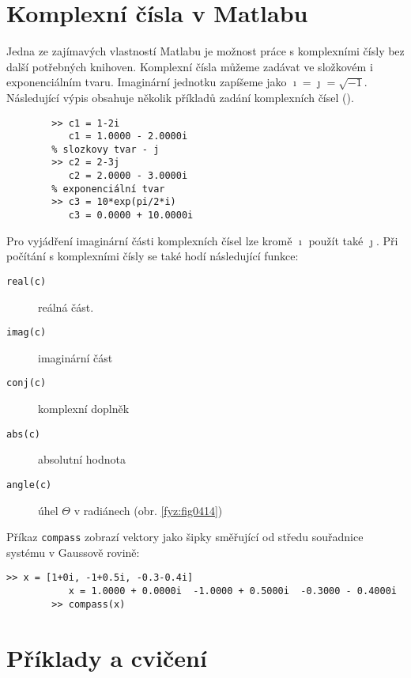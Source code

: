   \section{Komplexní čísla v Matlabu}\label{fyz:IchapXXIIsecVII}
    Jedna ze zajímavých vlastností Matlabu je možnost práce s komplexními čísly bez další potřebných
    knihoven. Komplexní čísla můžeme zadávat ve složkovém i exponenciálním tvaru. Imaginární
    jednotku zapíšeme jako \(\imath = \jmath = \sqrt{-1}\). Následující výpis obsahuje několik
    příkladů zadání komplexních čísel (\cite[s.~30]{Karban2006}).
    \begin{mdframed}[style=mdmsdos]
      \begin{lstlisting}[style=luaMatlabText,gobble=8]
        % slozkovy tvar - i
        >> c1 = 1-2i 
           c1 = 1.0000 - 2.0000i
        % slozkovy tvar - j
        >> c2 = 2-3j   
           c2 = 2.0000 - 3.0000i
        % exponenciální tvar
        >> c3 = 10*exp(pi/2*i)      
           c3 = 0.0000 + 10.0000i
      \end{lstlisting}
    \end{mdframed} 

    Pro vyjádření imaginární části komplexních čísel lze kromě \(\imath\) použít také \(\jmath\).
    Při počítání s komplexními čísly se také hodí následující funkce:
    \begin{description}
      \item[\texttt{real(c)}]    reálná část.
      \item[\texttt{imag(c)}]    imaginární část
      \item[\texttt{conj(c)}]    komplexní doplněk
      \item[\texttt{abs(c)}]     absolutní hodnota
      \item[\texttt{angle(c)}]   úhel \(\Theta\) v radiánech (obr. \ref{fyz:fig0414}) 
    \end{description}  

    Příkaz \texttt{compass} zobrazí vektory jako šipky směřující od středu souřadnice systému v
    Gaussově rovině:
    \begin{mdframed}[style=mdmsdos]
      \begin{lstlisting}[style=luaMatlabText,gobble=8]
        >> x = [1+0i, -1+0.5i, -0.3-0.4i]
           x = 1.0000 + 0.0000i  -1.0000 + 0.5000i  -0.3000 - 0.4000i
        >> compass(x)
      \end{lstlisting}
    \end{mdframed} 


  \section{Příklady a cvičení}\label{fyz:IchapXXIIsecVIII}
